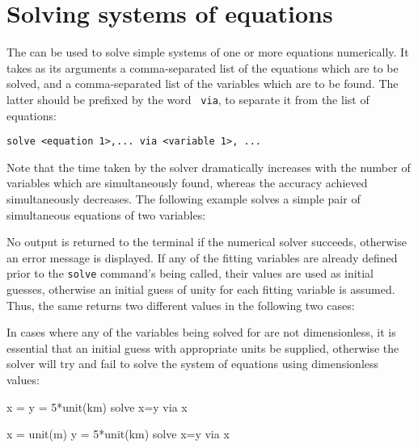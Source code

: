 \section{Solving systems of equations}

The  can be used to solve simple systems of one or more
equations numerically. It takes as its arguments a comma-separated list of the
equations which are to be solved, and a comma-separated list of the variables
which are to be found. The latter should be prefixed by the word {\tt
via}, to separate it from the list of equations:

\begin{verbatim}
solve <equation 1>,... via <variable 1>, ...
\end{verbatim}

Note that the time taken by the solver dramatically increases with the number
of variables which are simultaneously found, whereas the accuracy achieved
simultaneously decreases. The following example solves a simple pair of
simultaneous equations of two variables:

\vspace{3mm}

\vspace{3mm}

\noindent No output is returned to the terminal if the numerical solver
succeeds, otherwise an error message is displayed. If any of the fitting
variables are already defined prior to the {\tt solve} command's being called,
their values are used as initial guesses, otherwise an initial guess of unity
for each fitting variable is assumed. Thus, the same  returns
two different values in the following two cases:

\vspace{3mm}

\vspace{3mm}

\noindent In cases where any of the variables being solved for are not
dimensionless, it is essential that an initial guess with appropriate units be
supplied, otherwise the solver will try and fail to solve the system of
equations using dimensionless values:

\begin{dontdo}
x =\newline
y = 5*unit(km)\newline
solve x=y via x
\end{dontdo}

\begin{dodo}
x = unit(m)\newline
y = 5*unit(km)\newline
solve x=y via x
\end{dodo}

